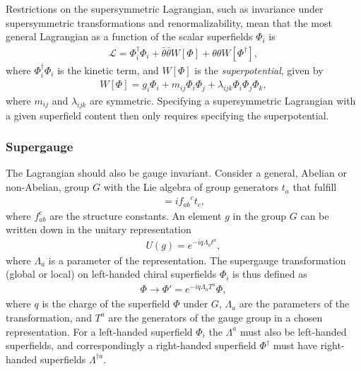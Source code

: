 \documentclass[twoside,english]{uiofysmaster}
\begin{document}
Restrictions on the supersymmetric Lagrangian, such as invariance under supersymmetric transformations and renormalizability, mean that the most general Lagrangian as a function of the scalar superfields $\Phi_i$ is
\begin{align}
\mathcal{L} = \Phi_i^{\dagger} \Phi_i + \bar{\theta} \bar{\theta} W[\Phi] + \theta \theta W[\Phi^{\dagger}],
\end{align}
where $\Phi_i^{\dagger} \Phi_i$ is the kinetic term, and $W[\Phi]$ is the \textit{superpotential}, given by
\begin{align}\label{Eq:: superpotential}
W[\Phi] = g_i \Phi_i + m_{ij} \Phi_i \Phi_j + \lambda_{ijk} \Phi_i \Phi_j \Phi_k,
\end{align}
where $m_{ij}$ and $\lambda_{ijk}$ are symmetric. Specifying a supersymmetric Lagrangian with a given superfield content then only requires specifying the superpotential. 

\subsubsection{Supergauge}\label{Sec:: phys back : Supergauge}



The Lagrangian should also be gauge invariant. Consider a general, Abelian or non-Abelian, group $G$ with the Lie algebra of group generators $t_a$ that fulfill
\begin{align}
[t_a, t_b] = i {f_{ab}}^ct_c,
\end{align}
where ${f_{ab}^c}$ are the structure constants. An element $g$ in the group $G$ can be written down in the unitary representation
\begin{align}
U(g) = e^{-i q\Lambda_at^a}, 
\end{align}
where $\Lambda_a$ is a parameter of the representation. The supergauge transformation (global or local) on left-handed chiral superfields $\Phi_i$ is thus defined as \cite{batzing2017lecture} 
\begin{align}
\Phi \rightarrow \Phi' = e^{-i q\Lambda_a T^a } \Phi,
\end{align} 
where $q$ is the charge of the superfield $\Phi$ under $G$, $\Lambda_a$ are the parameters of the transformation, and $T^a$ are the generators of the gauge group in a chosen representation. For a left-handed superfield $\Phi_i$ the $\Lambda^a$ must also be left-handed superfields, and correspondingly a right-handed superfield $\Phi^{\dagger}$ must have right-handed superfields $\Lambda^{\dagger a}$. 
\end{document}
